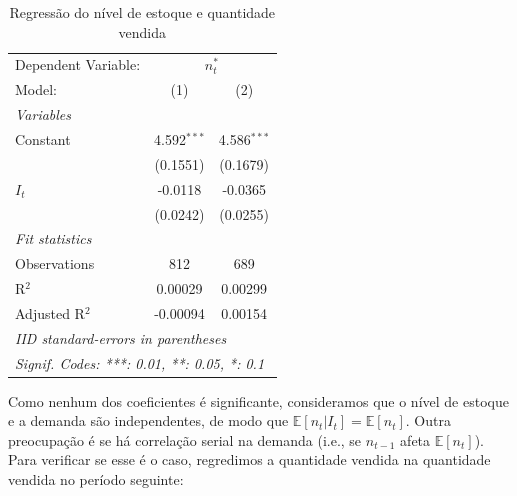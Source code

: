 \documentclass{article}
\begin{document}
\begin{table}[H]
\begingroup
\centering
\begin{tabular}{lcc}
   \tabularnewline \midrule \midrule
   Dependent Variable: & \multicolumn{2}{c}{$n^*_t$}\\
   Model:         & (1)           & (2)\\  
   \midrule
   \emph{Variables}\\
   Constant       & 4.592$^{***}$ & 4.586$^{***}$\\   
                  & (0.1551)      & (0.1679)\\   
   $I_t$           & -0.0118       & -0.0365\\   
                  & (0.0242)      & (0.0255)\\   
   \midrule
   \emph{Fit statistics}\\
   Observations   & 812           & 689\\  
   R$^2$          & 0.00029       & 0.00299\\  
   Adjusted R$^2$ & -0.00094      & 0.00154\\  
   \midrule \midrule
   \multicolumn{3}{l}{\emph{IID standard-errors in parentheses}}\\
   \multicolumn{3}{l}{\emph{Signif. Codes: ***: 0.01, **: 0.05, *: 0.1}}\\
\end{tabular}
\par\endgroup
    \caption{Regressão do nível de estoque e quantidade vendida}
    \label{tab:regs}
\end{table}

Como nenhum dos coeficientes é significante, consideramos que o nível de estoque e a demanda são independentes, de modo que $\mathbb{E}[n_t | I_t] = \mathbb{E}[n_t]$. Outra preocupação é se há correlação serial na demanda (i.e., se $n_{t-1}$ afeta $\mathbb{E}[n_t]$). Para verificar se esse é o caso, regredimos a quantidade vendida na quantidade vendida no período seguinte:%
\end{document}
